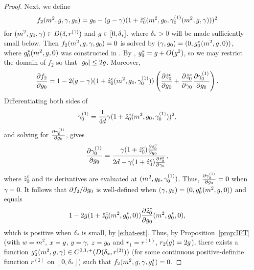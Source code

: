 \begin{proof}
Next, we define
\begin{equation}
f_2(m^2, g, \gamma, g_0)
	=
g_0 - (g - \gamma) (1 + \hat z_0^c(m^2, g_0, \gamma^{(1)}_0(m^2, g, \gamma)))^2
\end{equation}
for $(m^2, g_0, \gamma) \in D(\delta, r^{(1)})$ and $g \in [0, \delta_*]$,
where $\delta_* > 0$ will be made sufficiently small below.
Then $f_2(m^2, g, \gamma, g_0) = 0$ is solved by
$(\gamma, g_0) = (0, g_0^*(m^2, g, 0))$,
where $g_0^*(m^2, g, 0)$ was constructed in \cite[\eqref{log-e:ccstar2}]{BBS-saw4-log}.
By \cite[\eqref{log-e:gznustarbd}]{BBS-saw4-log}, $g_0^* = g + O(g^2)$,
so we may restrict the domain of $f_2$ so that $|g_0| \le 2 g$.
Moreover,
\begin{equation}
\frac{\partial f_2}{\partial g_0}
	=
1 - 2 (g - \gamma) (1 + \hat z_0^c(m^2, g_0, \gamma^{(1)}_0))
\left( \frac{\partial \hat z_0^c}{\partial g_0} + \frac{\partial \hat z_0^c}{\partial \gamma_0} \frac{\partial \gamma^{(1)}_0}{\partial g_0} \right).
\end{equation}
Differentiating both sides of
\begin{equation}
\gamma^{(1)}_0
	=
\frac{1}{4d} \gamma (1 + \hat z_0^c(m^2, g_0, \gamma^{(1)}_0))^2,
\end{equation}
and solving for $\frac{\partial \gamma^{(1)}_0}{\partial g_0}$, gives
\begin{equation}
\frac{\partial \gamma^{(1)}_0}{\partial g_0}
	=
\frac{\gamma (1 + \hat z_0^c)
	\frac{\partial \hat z_0^c}{\partial g_0}}{2 d - \gamma (1 + \hat z_0^c) \frac{\partial \hat z_0^c}{\partial \gamma_0}},
\end{equation}
where $\hat z_0^c$ and its derivatives are evaluated at $(m^2, g_0, \gamma^{(1)}_0)$.
Thus, $\frac{\partial \gamma^{(1)}_0}{\partial g_0} = 0$ when $\gamma = 0$.
It follows that $\partial f_2/\partial g_0$
is well-defined when $(\gamma, g_0) = (0, g_0^*(m^2, g, 0))$ and equals
\begin{equation}
1 - 2 g (1 + \hat z_0^c(m^2, g_0^*, 0)) \frac{\partial \hat z_0^c}{\partial g_0}(m^2, g_0^*, 0),
\end{equation}
which is positive when $\delta_*$ is small, by \eqref{e:hat-est}.
Thus, by Proposition~\ref{prop:IFT}
(with $w = m^2$, $x = g$, $y = \gamma$, $z = g_0$ and $r_1 = r^{(1)}$, $r_2(g) = 2g$),
there exists a function $g_0^*(m^2, g, \gamma) \in C^{0,1,+}(D(\delta_*, r^{(2)}))$
(for some continuous positive-definite function $r^{(2)}$ on $[0, \delta_*]$)
such that $f_2(m^2, g, \gamma, g_0^*) = 0$.


\end{proof}
